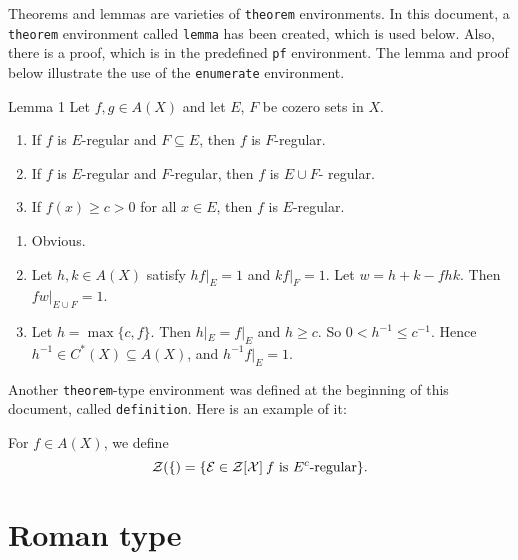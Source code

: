 Theorems and lemmas are varieties of \verb+theorem+ environments.  In this
document, a \verb+theorem+ environment called \verb+lemma+ has been created,
which is used below. Also, there is a  proof, which is in the predefined
\verb+pf+ environment.  The lemma and proof below illustrate the use of 
the \verb+enumerate+ environment. 

\begin{lemma}
{Lemma 1} Let $f, g\in  A(X)$ and let $E$, $F$ be cozero
sets in $X$.
\begin{enumerate}
\item If $f$ is $E$-regular and $F\subseteq E$, then $f$ is $F$-regular.

\item If $f$ is $E$-regular and $F$-regular, then $f$ is $E\cup F$-%
regular.

\item If $f(x)\ge c>0$ for all $x\in E$, then $f$ is $E$-regular.

\end{enumerate}
\end{lemma}

\begin{pf}
\begin{enumerate}

\item  Obvious.

\item Let $h, k\in A(X)$ satisfy $hf|_E=1$ and $kf|_F=1$. Let
$w=h+k-fhk$. Then $fw|_{E\cup F}=1$.

\item Let $h=\max\{c,f\}$. Then $h|_E=f|_E$ and $h\ge c$. So $0<h^{-1}
\le c^{-1}$. Hence $h^{-1} \in C^*(X)\subseteq A(X)$, and 
$h^{-1} f|_E=1$. 

\end{enumerate}
\end{pf}

Another \verb+theorem+-type environment was defined at the beginning of this
document, called \verb+definition+. Here is an example of it:

\begin{definition}
For $f\in A(X)$, we define
$$
\cal Z (f)=\{E\in Z[X]\: \text{$f$ is $E^c$-regular}\}.
$$
\end{definition}

\section{Roman type}

